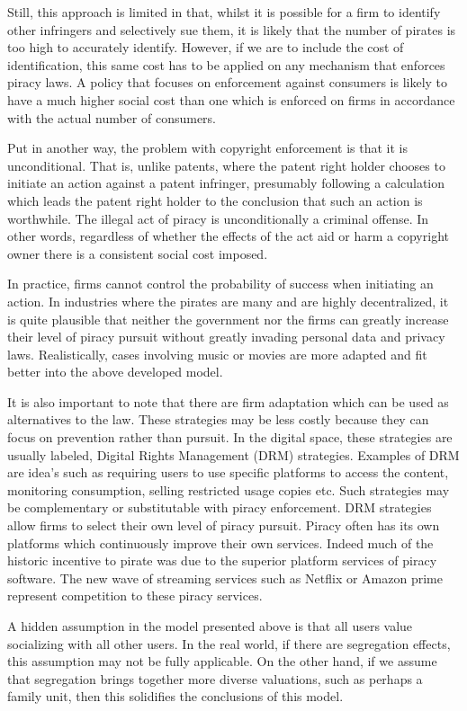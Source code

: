 \documentclass[12pt]{article}
\numberwithin{equation}{section}
\begin{document}
Still, this approach is limited in that, whilst it is possible for a firm to identify other infringers and selectively sue them, it is likely that the number of pirates is too high to accurately identify. However, if we are to include the cost of identification, this same cost has to be applied on any mechanism that enforces piracy laws. A policy that focuses on enforcement against consumers is likely to have a much higher social cost than one which is enforced on firms in accordance with the actual number of consumers. 

Put in another way, the problem with copyright enforcement is that it is unconditional. That is, unlike patents, where the patent right holder chooses to initiate an action against a patent infringer, presumably following a calculation which leads the patent right holder to the conclusion that such an action is worthwhile. The illegal act of piracy is unconditionally a criminal offense. In other words, regardless of whether the effects of the act aid or harm a copyright owner there is a consistent social cost imposed. 

In practice, firms cannot control the probability of success when initiating an action. In industries where the pirates are many and are highly decentralized, it is quite plausible that neither the government nor the firms can greatly increase their level of piracy pursuit without greatly invading personal data and privacy laws. Realistically, cases involving music or movies are more adapted and fit better into the above developed model. 

It is also important to note that there are firm adaptation which can be used as alternatives to the law. These strategies may be less costly because they can focus on prevention rather than pursuit. In the digital space, these strategies are usually labeled, Digital Rights Management (DRM) strategies. Examples of DRM are idea's such as requiring users to use specific platforms to access the content, monitoring consumption, selling restricted usage copies etc. Such strategies may be complementary or substitutable with piracy enforcement. DRM strategies allow firms to select their own level of piracy pursuit. Piracy often has its own platforms which continuously improve their own services. Indeed much of the historic incentive to pirate was due to the superior platform services of piracy software. The new wave of streaming services such as Netflix or Amazon prime represent competition to these piracy services.


A hidden assumption in the model presented above is that all users value socializing with all other users. In the real world, if there are segregation effects, this assumption may not be fully applicable. On the other hand, if we assume that segregation brings together more diverse valuations, such as perhaps a family unit, then this solidifies the conclusions of this model.
\end{document}
